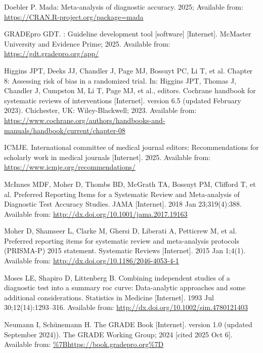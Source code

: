 \documentclass[
  10pt,
  a4paper,
  DIV=11,
  numbers=noendperiod]{scrreprt}
\newlength{\cslhangindent}
\newenvironment{CSLReferences}[2] %
 {\begin{list}{}{%
  \setlength{\itemindent}{0pt}
  \setlength{\leftmargin}{0pt}
  \setlength{\parsep}{0pt}
  \ifodd #1
   \setlength{\leftmargin}{\cslhangindent}
   \setlength{\itemindent}{-1\cslhangindent}
  \fi
  \setlength{\itemsep}{#2\baselineskip}}}
 {\end{list}}
\begin{document}
\label{refs}
\begin{CSLReferences}{1}{1}
Doebler P. Mada: Meta-analysis of diagnostic accuracy. 2025; Available
from: \url{https://CRAN.R-project.org/package=mada}

GRADEpro GDT. : Guideline development tool {[}software{]}
{[}Internet{]}. {McMaster University and Evidence Prime}; 2025.
Available from: \url{https://gdt.gradepro.org/app/}

Higgins JPT, Deeks JJ, Chandler J, Page MJ, Bossuyt PC, Li T, et al.
Chapter 8: Assessing risk of bias in a randomized trial. In: Higgins
JPT, Thomas J, Chandler J, Cumpston M, Li T, Page MJ, et al., editors.
Cochrane handbook for systematic reviews of interventions
{[}Internet{]}. version 6.5 (updated February 2023). Chichester, UK:
Wiley-Blackwell; 2023. Available from:
\url{https://www.cochrane.org/authors/handbooks-and-manuals/handbook/current/chapter-08}

ICMJE. International committee of medical journal editors:
Recommendations for scholarly work in medical journals {[}Internet{]}.
2025. Available from: \url{https://www.icmje.org/recommendations/}

McInnes MDF, Moher D, Thombs BD, McGrath TA, Bossuyt PM, Clifford T, et
al. Preferred Reporting Items for a Systematic Review and Meta-analysis
of Diagnostic Test Accuracy Studies. JAMA {[}Internet{]}. 2018 Jan
23;319(4):388. Available from:
\url{http://dx.doi.org/10.1001/jama.2017.19163}

Moher D, Shamseer L, Clarke M, Ghersi D, Liberati A, Petticrew M, et al.
Preferred reporting items for systematic review and meta-analysis
protocols (PRISMA-P) 2015 statement. Systematic Reviews {[}Internet{]}.
2015 Jan 1;4(1). Available from:
\url{http://dx.doi.org/10.1186/2046-4053-4-1}

Moses LE, Shapiro D, Littenberg B. Combining independent studies of a
diagnostic test into a summary roc curve: Data{-}analytic approaches and
some additional considerations. Statistics in Medicine {[}Internet{]}.
1993 Jul 30;12(14):1293--316. Available from:
\url{http://dx.doi.org/10.1002/sim.4780121403}

Neumann I, Schünemann H. {The GRADE Book} {[}Internet{]}. version 1.0
(updated September 2024)). The GRADE Working Group; 2024 {[}cited 2025
Oct 6{]}. Available from: \url{\%7Bhttps://book.gradepro.org\%7D}


\end{CSLReferences}
\end{document}
